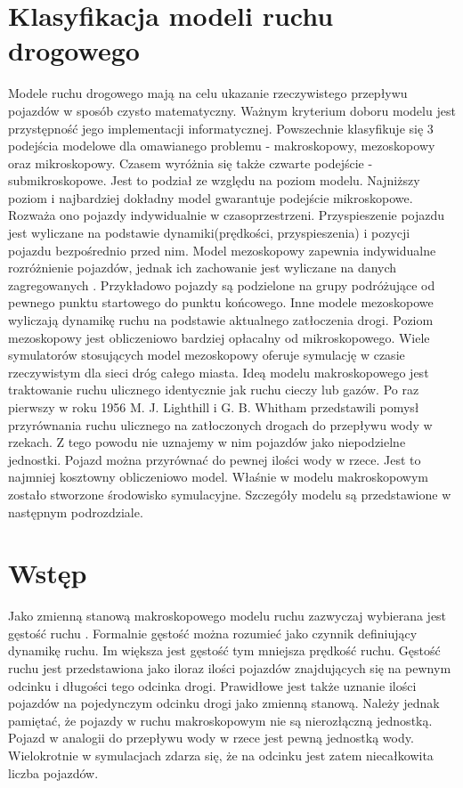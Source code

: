 \documentclass[12pt]{book}
\theoremstyle{plain}
\begin{document}
\section{Klasyfikacja modeli ruchu drogowego}
Modele ruchu drogowego mają na celu ukazanie rzeczywistego przepływu pojazdów w sposób czysto matematyczny. Ważnym kryterium doboru modelu jest przystępność jego implementacji informatycznej. Powszechnie klasyfikuje się 3 podejścia modelowe dla omawianego problemu \cite{CompareModels} - makroskopowy, mezoskopowy oraz mikroskopowy. Czasem \cite{multilevel} wyróżnia się także czwarte podejście - submikroskopowe. Jest to podział ze względu na poziom modelu. Najniższy poziom i najbardziej dokładny model gwarantuje podejście mikroskopowe. Rozważa ono pojazdy indywidualnie w czasoprzestrzeni. Przyspieszenie pojazdu jest wyliczane na podstawie dynamiki(prędkości, przyspieszenia) i pozycji pojazdu bezpośrednio przed nim. Model mezoskopowy zapewnia indywidualne rozróżnienie pojazdów, jednak ich zachowanie jest wyliczane na danych zagregowanych \cite{mesoscopic}. Przykładowo pojazdy są podzielone na grupy podróżujące od pewnego punktu startowego do punktu końcowego. Inne modele \cite{mesoscopic2} mezoskopowe wyliczają dynamikę ruchu na podstawie aktualnego zatłoczenia drogi. Poziom mezoskopowy jest obliczeniowo bardziej opłacalny od mikroskopowego.
Wiele symulatorów stosujących model mezoskopowy oferuje symulację w czasie rzeczywistym dla sieci dróg całego miasta\cite{vu2017high}. Ideą modelu makroskopowego jest traktowanie ruchu ulicznego identycznie jak ruchu cieczy lub gazów. Po raz pierwszy w roku 1956 M. J. Lighthill i G. B. Whitham \cite{lwr} przedstawili pomysł przyrównania ruchu ulicznego na zatłoczonych drogach do przepływu wody w rzekach. Z tego powodu nie uznajemy w nim pojazdów jako niepodzielne jednostki. Pojazd można przyrównać do pewnej ilości wody w rzece.
Jest to najmniej kosztowny obliczeniowo model. Właśnie w modelu makroskopowym zostało stworzone środowisko symulacyjne. Szczegóły modelu są przedstawione w następnym podrozdziale.

\section{Wstęp}
Jako zmienną stanową makroskopowego modelu ruchu zazwyczaj wybierana jest gęstość ruchu \cite{gottlich,CompareModels}. Formalnie gęstość można rozumieć jako czynnik definiujący dynamikę ruchu. Im większa jest gęstość tym mniejsza prędkość ruchu. Gęstość ruchu \cite{helbing2001master} jest przedstawiona jako iloraz ilości pojazdów znajdujących się na pewnym odcinku i długości tego odcinka drogi. Prawidłowe jest także uznanie ilości pojazdów na pojedynczym odcinku drogi jako zmienną stanową. Należy jednak pamiętać, że pojazdy w ruchu makroskopowym nie są nierozłączną jednostką. Pojazd w analogii do przepływu wody w rzece jest pewną jednostką wody. Wielokrotnie w symulacjach zdarza się, że na odcinku jest zatem niecałkowita liczba pojazdów.
\end{document}
